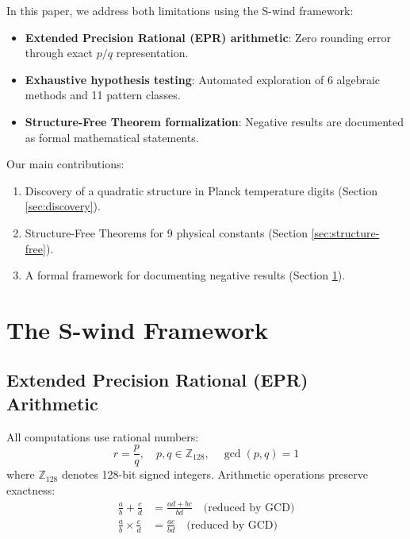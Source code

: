 \documentclass[11pt,a4paper]{article}
\begin{document}
In this paper, we address both limitations using the S-wind framework:
\begin{itemize}
    \item \textbf{Extended Precision Rational (EPR) arithmetic}: Zero rounding error through exact $p/q$ representation.
    \item \textbf{Exhaustive hypothesis testing}: Automated exploration of 6 algebraic methods and 11 pattern classes.
    \item \textbf{Structure-Free Theorem formalization}: Negative results are documented as formal mathematical statements.
\end{itemize}

Our main contributions:
\begin{enumerate}
    \item Discovery of a quadratic structure in Planck temperature digits (Section \ref{sec:discovery}).
    \item Structure-Free Theorems for 9 physical constants (Section \ref{sec:structure-free}).
    \item A formal framework for documenting negative results (Section \ref{sec:framework}).
\end{enumerate}

\section{The S-wind Framework}
\label{sec:framework}

\subsection{Extended Precision Rational (EPR) Arithmetic}

All computations use rational numbers:
\begin{equation}
    r = \frac{p}{q}, \quad p, q \in \mathbb{Z}_{128}, \quad \gcd(p, q) = 1
\end{equation}
where $\mathbb{Z}_{128}$ denotes 128-bit signed integers. Arithmetic operations preserve exactness:
\begin{align}
    \frac{a}{b} + \frac{c}{d} &= \frac{ad + bc}{bd} \quad \text{(reduced by GCD)} \\
    \frac{a}{b} \times \frac{c}{d} &= \frac{ac}{bd} \quad \text{(reduced by GCD)}
\end{align}
\end{document}
